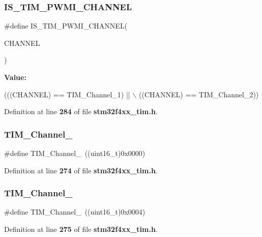 \subsubsection{I\+S\+\_\+\+T\+I\+M\+\_\+\+P\+W\+M\+I\+\_\+\+C\+H\+A\+N\+N\+EL}
{\footnotesize\ttfamily \#define I\+S\+\_\+\+T\+I\+M\+\_\+\+P\+W\+M\+I\+\_\+\+C\+H\+A\+N\+N\+EL(\begin{DoxyParamCaption}\item[{}]{C\+H\+A\+N\+N\+EL }\end{DoxyParamCaption})}

{\bfseries Value\+:}
\begin{DoxyCode}
(((CHANNEL) == TIM_Channel_1) || \(\backslash\)
                                      ((CHANNEL) == TIM_Channel_2))
\end{DoxyCode}


Definition at line \textbf{ 284} of file \textbf{ stm32f4xx\+\_\+tim.\+h}.

\mbox{\label{group__TIM__Channel_ga69ea7f558f02c63dd1082d784d2449bd}} 
\subsubsection{T\+I\+M\+\_\+\+Channel\+\_}
{\footnotesize\ttfamily \#define T\+I\+M\+\_\+\+Channel\+\_~((uint16\+\_\+t)0x0000)}



Definition at line \textbf{ 274} of file \textbf{ stm32f4xx\+\_\+tim.\+h}.

\mbox{\label{group__TIM__Channel_ga03d7da8269a87a560f68985b4bd80931}} 
\subsubsection{T\+I\+M\+\_\+\+Channel\+\_}
{\footnotesize\ttfamily \#define T\+I\+M\+\_\+\+Channel\+\_~((uint16\+\_\+t)0x0004)}



Definition at line \textbf{ 275} of file \textbf{ stm32f4xx\+\_\+tim.\+h}.

\mbox{\label{group__TIM__Channel_ga012711b19e8c91f6f352801a3dc0bcc9}} 

